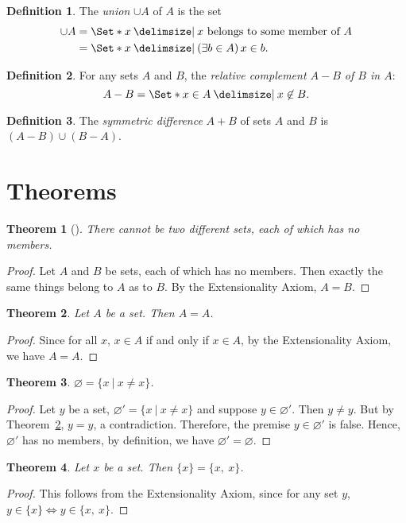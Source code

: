 \documentclass[12pt]{article}
\theoremstyle{plain}
\newtheorem{thm}{Theorem}[section]
\theoremstyle{remark}
\theoremstyle{definition}
\newtheorem{defn}{Definition}[section]
\theoremstyle{remark}
\newcommand{\thmproof}[3]{%
 \begin{thm}[#1]
  #2
 \end{thm}
 \begin{proof}
  #3
 \end{proof}
}
\providecommand\st{}
\newcommand\SetSymbol[1][]{%
 \nonscript\:#1\vert%
 \allowbreak%
 \nonscript\:
\mathopen{}}
\renewcommand\st{\SetSymbol[\delimsize]}
\begin{document}
\begin{defn}
 The \textit{union} $\cup A$ of $A$ is the set
 \begin{align*}
  \cup A &= \Set*{x \st \text{$x$ belongs to some member of $A$}}\\
         &= \Set*{x \st (\exists b \in A)\, x \in b}.
 \end{align*}
\end{defn}

\begin{defn}
 For any sets $A$ and $B$, the \textit{relative complement $A-B$ of $B$ in $A$}:
 \[
  A - B = \Set*{x \in A \st x \not\in B}.
 \]
\end{defn}

\begin{defn}
 The \textit{symmetric difference} $A+B$ of sets $A$ and $B$ is $(A - B) \cup (B - A)$.
\end{defn}
\section{Theorems}
\thmproof{}{There cannot be two different sets, each of which has no members.}
{Let $A$ and $B$ be sets, each of which has no members. Then exactly the same things belong to $A$ as to $B$. By the Extensionality Axiom, $A = B$.
}

\begin{thm}\label{identity}
 Let $A$ be a set. Then $A = A$.
\end{thm}
\begin{proof}
 Since for all $x$, $x \in A$ if and only if $x \in A$, by the Extensionality Axiom, we have $A = A$.
\end{proof}

\begin{thm}
 $\varnothing = \{x\ |\ x \neq x\}$.
\end{thm}
\begin{proof}
 Let $y$ be a set, $\varnothing' = \{x\ |\ x \neq x\}$ and suppose $y \in \varnothing'$. Then $y \neq y$. But by Theorem~\ref{identity}, $y = y$, a contradiction. Therefore, the premise $y \in \varnothing'$ is false. Hence, $\varnothing'$ has no members, by definition, we have $\varnothing' = \varnothing$.
\end{proof}

\begin{thm}\label{multi}
 Let $x$ be a set. Then $\{x\} = \{x,\ x\}$.
\end{thm}
\begin{proof}
 This follows from the Extensionality Axiom, since for any set $y$, $y \in \{x\} \Leftrightarrow y \in \{x,\ x\}$.
\end{proof}
\end{document}
